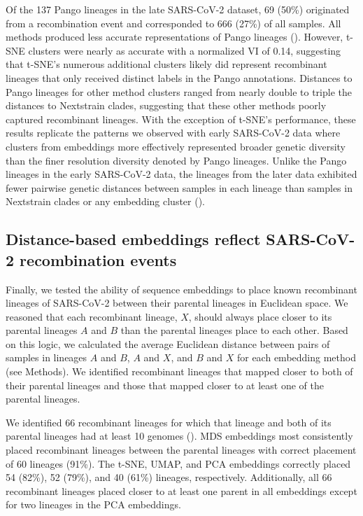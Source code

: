 \documentclass[10pt,letterpaper]{article}
\begin{document}
Of the 137 Pango lineages in the late SARS-CoV-2 dataset, 69 (50\%) originated from a recombination event and corresponded to 666 (27\%) of all samples.
All methods produced less accurate representations of Pango lineages ().
However, t-SNE clusters were nearly as accurate with a normalized VI of 0.14, suggesting that t-SNE's numerous additional clusters likely did represent recombinant lineages that only received distinct labels in the Pango annotations.
Distances to Pango lineages for other method clusters ranged from nearly double to triple the distances to Nextstrain clades, suggesting that these other methods poorly captured recombinant lineages.
With the exception of t-SNE's performance, these results replicate the patterns we observed with early SARS-CoV-2 data where clusters from embeddings more effectively represented broader genetic diversity than the finer resolution diversity denoted by Pango lineages.
Unlike the Pango lineages in the early SARS-CoV-2 data, the lineages from the later data exhibited fewer pairwise genetic distances between samples in each lineage than samples in Nextstrain clades or any embedding cluster ().

\subsection*{Distance-based embeddings reflect SARS-CoV-2 recombination events}

Finally, we tested the ability of sequence embeddings to place known recombinant lineages of SARS-CoV-2 between their parental lineages in Euclidean space.
We reasoned that each recombinant lineage, $X$, should always place closer to its parental lineages $A$ and $B$ than the parental lineages place to each other.
Based on this logic, we calculated the average Euclidean distance between pairs of samples in lineages $A$ and $B$, $A$ and $X$, and $B$ and $X$ for each embedding method (see Methods).
We identified recombinant lineages that mapped closer to both of their parental lineages and those that mapped closer to at least one of the parental lineages.

We identified 66 recombinant lineages for which that lineage and both of its parental lineages had at least 10 genomes ().
MDS embeddings most consistently placed recombinant lineages between the parental lineages with correct placement of 60 lineages (91\%).
The t-SNE, UMAP, and PCA embeddings correctly placed 54 (82\%), 52 (79\%), and 40 (61\%) lineages, respectively.
Additionally, all 66 recombinant lineages placed closer to at least one parent in all embeddings except for two lineages in the PCA embeddings.
\end{document}
